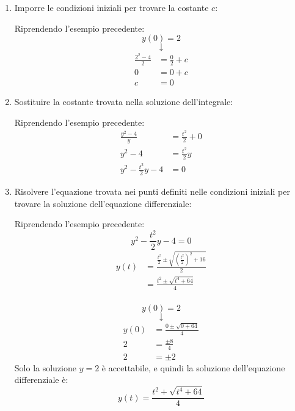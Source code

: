 \documentclass{article}
\begin{document}
\begin{enumerate}
  \item Imporre le condizioni iniziali per trovare la costante \( c \):
    \begin{example}
      Riprendendo l'esempio precedente:
      \[
        y(0) = 2
      \] 
      \[
        \downarrow
      \] 
      \[
        \begin{aligned}
          \frac{2^2 - 4}{2} &= \frac{0}{2} + c\\
          0 &= 0 + c\\
          c &= 0
        \end{aligned}
      \] 
    \end{example}

  \item Sostituire la costante trovata nella soluzione dell'integrale:
    \begin{example}
      Riprendendo l'esempio precedente:
      \[
        \begin{aligned}
          \frac{y^2 - 4}{y} &= \frac{t^2}{2} + 0\\
          y^2 - 4 &= \frac{t^2}{2}y\\
          y^2 - \frac{t^2}{2}y - 4 &= 0
        \end{aligned}
      \] 
    \end{example}

  \item Risolvere l'equazione trovata nei punti definiti nelle condizioni iniziali
    per trovare la soluzione dell'equazione differenziale:
    \begin{example}
      Riprendendo l'esempio precedente:
      \[
        y^2 - \frac{t^2}{2}y - 4 = 0
      \] 
      \[
        \begin{aligned}
          y(t) &= \frac{\frac{t^2}{2} \pm \sqrt{\left(\frac{t^2}{2}\right)^2 + 16}}{2}\\
               &= \frac{t^2 \pm \sqrt{t^4+64}}{4}\\
        \end{aligned}
      \] 

      \[
        y(0) = 2
      \] 
      \[
        \downarrow
      \] 
      \[
        \begin{aligned}
          y(0) &= \frac{0 \pm \sqrt{0+64}}{4}\\
          2 &= \frac{\pm 8}{4}\\
          2 &= \pm 2
        \end{aligned}
      \] 
      Solo la soluzione \( y = 2 \) è accettabile, e quindi la soluzione dell'equazione differenziale
      è:
      \[
        y(t) = \frac{t^2 + \sqrt{t^4+64}}{4}
      \] 
    \end{example}
\end{enumerate}
\end{document}
